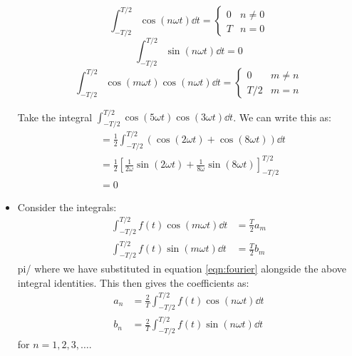 \begin{itemize}
    \begin{equation}
        \int_{-T/2}^{T/2} \cos(n\omega t)\dd{t} = \begin{cases}
            0 & n\neq 0 \\ 
            T & n=0
        \end{cases}
    \end{equation}
    \begin{equation}
        \int_{-T/2}^{T/2}\sin(n\omega t)\dd{t} = 0
    \end{equation}
    \begin{equation}
        \int_{-T/2}^{T/2}\cos(m\omega t)\cos(n\omega t)\dd{t} = \begin{cases}
            0 & m\neq n \\ 
            T/2 & m=n
        \end{cases}
    \end{equation}
    \begin{example}
        Take the integral $\int_{-T/2}^{T/2} \cos(5\omega t)\cos(3\omega t)\dd{t}$. We can write this as:
        \begin{align}
            &= \frac{1}{2}\int_{-T/2}^{T/2}(\cos(2\omega t) + \cos(8\omega t))\dd{t} \\ 
            &= \frac{1}{2}\left[\frac{1}{2\omega} \sin(2\omega t) + \frac{1}{8\omega}\sin(8\omega t)\right]^{T/2}_{-T/2} \\ 
            &= 0
        \end{align}
    \end{example}
    \item Consider the integrals:
    \begin{align}
        \int_{-T/2}^{T/2} f(t)\cos(m\omega t) \dd{t} &= \frac{T}{2}a_m \\ 
        \int_{-T/2}^{T/2} f(t)\sin(m\omega t) \dd{t} &= \frac{T}{2}b_m 
    \end{align}pi/
    where we have substituted in equation \ref{eqn:fourier} alongside the above integral identities. This then gives the coefficients as:
    \begin{align}
        a_n &= \frac{2}{T}\int_{-T/2}^{T/2} f(t)\cos(n\omega t)\dd{t} \\ 
        b_n &= \frac{2}{T}\int_{-T/2}^{T/2} f(t)\sin(n\omega t)\dd{t}
    \end{align}
    for $n=1,2,3,\dots$.

\end{itemize}
